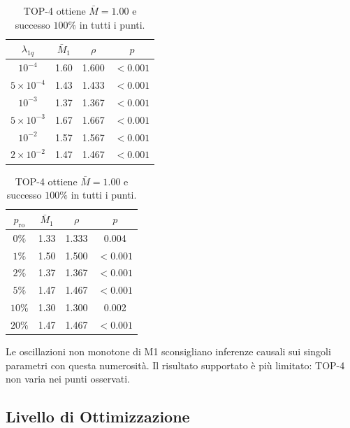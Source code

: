 \begin{onehalfspace}
\begin{table}[H]
\centering
\caption[Sweep di $\lambda_{1q}$]{TOP-4 ottiene $\bar M=1.00$ e
successo $100\%$ in tutti i punti.}
\label{tab:sweep_eps1q}
\begin{tabular}{cccc}
\toprule
$\lambda_{1q}$ & $\bar M_1$ & $\rho$ & $p$ \\
\midrule
$10^{-4}$ & 1.60 & 1.600 & $<0.001$ \\
$5\times10^{-4}$ & 1.43 & 1.433 & $<0.001$ \\
$10^{-3}$ & 1.37 & 1.367 & $<0.001$ \\
$5\times10^{-3}$ & 1.67 & 1.667 & $<0.001$ \\
$10^{-2}$ & 1.57 & 1.567 & $<0.001$ \\
$2\times10^{-2}$ & 1.47 & 1.467 & $<0.001$ \\
\bottomrule
\end{tabular}
\end{table}

\begin{table}[H]
\centering
\caption[Sweep del readout simmetrico]{TOP-4 ottiene $\bar M=1.00$ e
successo $100\%$ in tutti i punti.}
\label{tab:sweep_pro}
\begin{tabular}{cccc}
\toprule
$p_{\mathrm{ro}}$ & $\bar M_1$ & $\rho$ & $p$ \\
\midrule
$0\%$ & 1.33 & 1.333 & 0.004 \\
$1\%$ & 1.50 & 1.500 & $<0.001$ \\
$2\%$ & 1.37 & 1.367 & $<0.001$ \\
$5\%$ & 1.47 & 1.467 & $<0.001$ \\
$10\%$ & 1.30 & 1.300 & 0.002 \\
$20\%$ & 1.47 & 1.467 & $<0.001$ \\
\bottomrule
\end{tabular}
\end{table}

Le oscillazioni non monotone di M1 sconsigliano inferenze causali sui
singoli parametri con questa numerosità. Il risultato supportato è più
limitato: TOP-4 non varia nei punti osservati.

\subsection{Livello di Ottimizzazione}
\label{subsec:sensibilita_metodo}


\end{onehalfspace}
